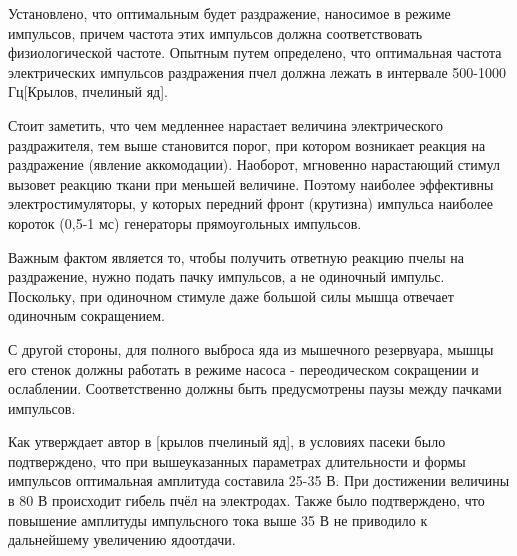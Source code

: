Установлено, что оптимальным будет раздражение, наносимое в режиме импульсов, причем частота этих импульсов должна соответствовать физиологической частоте. Опытным путем определено, что оптимальная частота электрических импульсов раздражения пчел должна лежать в интервале 500-1000 Гц[Крылов, пчелиный яд].

Стоит заметить, что чем медленнее нарастает величина электрического раздражителя, тем выше становится порог, при котором возникает реакция на раздражение (явление аккомодации). Наоборот, мгновенно нарастающий стимул вызовет реакцию ткани при меньшей величине. Поэтому наиболее эффективны электростимуляторы, у которых передний фронт (крутизна) импульса наиболее короток (0,5-1 мс) \longndash генераторы прямоугольных импульсов.

Важным фактом является то, чтобы получить ответную реакцию пчелы на раздражение, нужно подать пачку импульсов, а не одиночный импульс. Поскольку, при одиночном стимуле даже большой силы мышца отвечает одиночным сокращением.

С другой стороны, для полного выброса яда из мышечного резервуара, мышцы его стенок должны работать в режиме насоса - переодическом сокращении и ослаблении. Соответственно должны быть предусмотрены паузы между пачками импульсов.

Как утверждает автор в [крылов пчелиный яд], в условиях пасеки было подтверждено, что при вышеуказанных параметрах длительности и формы импульсов оптимальная амплитуда составила 25-35 В. При достижении величины в 80 В происходит гибель пчёл на электродах. Также было подтверждено, что повышение амплитуды импульсного тока выше 35 В не приводило к дальнейшему увеличению ядоотдачи.
